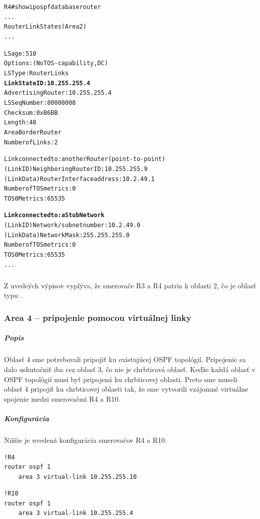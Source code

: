 \documentclass[12pt,twoside,a4paper]{article}
\begin{document}
\noindent
{\selectfont
\begin{small}
\begin{alltt}
R4#show ip ospf database router
...
		Router Link States (Area 2)
...

          
  LS age: 510
  Options: (No TOS-capability, DC)
  LS Type: Router Links
  \textbf{Link State ID: 10.255.255.4}
  Advertising Router: 10.255.255.4
  LS Seq Number: 80000008
  Checksum: 0xB6BB
  Length: 48
  Area Border Router
  Number of Links: 2

    Link connected to: another Router (point-to-point)
     (Link ID) Neighboring Router ID: 10.255.255.9
     (Link Data) Router Interface address: 10.2.49.1
      Number of TOS metrics: 0
       TOS 0 Metrics: 65535

    \textbf{Link connected to: a Stub Network}
     (Link ID) Network/subnet number: 10.2.49.0
     (Link Data) Network Mask: 255.255.255.0
      Number of TOS metrics: 0
       TOS 0 Metrics: 65535
...

\end{alltt}
\end{small}
}

\subparagraph{}
Z uvedeých výpisov vyplýva, že smerovače R3 a R4 patria k oblasti 2, čo je oblasť typu .

\subsubsection*{Area 4 – pripojenie pomocou virtuálnej linky}
\subparagraph{Popis}
\subparagraph{}
Oblasť 4 sme potrebovali pripojiť ku existujúcej OSPF topológií. Pripojenie sa dalo uskutočniť iba cez oblasť 3, čo nie je chrbticová oblasť. Keďže každá oblasť v OSPF topológií musí byť pripojená ku chrbticovej oblasti. Preto sme museli oblasť 4 pripojiť ku chrbticovej oblasti tak, že sme vytvorili vzájomné virtuálne spojenie medzi smerovačmi R4 a R10.

\subparagraph{Konfigurácia}
\subparagraph{}
Nižšie je uvedená konfigurácia smerovačov R4 a R10.

\noindent
{\selectfont
\begin{small}
\begin{verbatim}
!R4
router ospf 1
    area 3 virtual-link 10.255.255.10

\end{verbatim}
\end{small}
}

\noindent
{\selectfont
\begin{small}
\begin{verbatim}
!R10
router ospf 1
    area 3 virtual-link 10.255.255.4

\end{verbatim}
\end{small}
}
\end{document}
